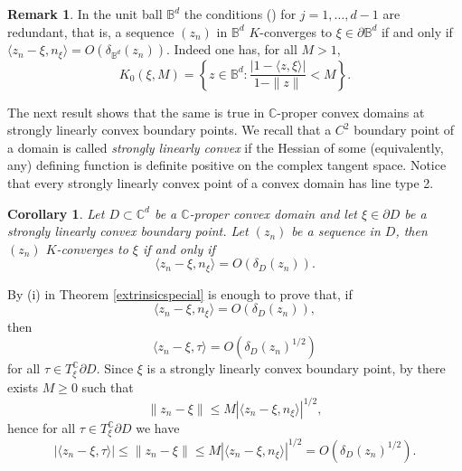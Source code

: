 \documentclass[11pt, reqno]{amsart}
\numberwithin{equation}{section}
\newtheorem{corollary}[theorem]{Corollary}
\theoremstyle{definition}
\newtheorem{remark}[theorem]{Remark}
\newcommand{\C}{\mathbb{C}}
\newcommand{\B}{\mathbb{B}}
\begin{document}
{{		
			\begin{remark}\label{restrictedball}In the unit ball $\B^d$ the conditions () for $j=1,\dots,d-1$ are redundant, that is, 
			a sequence $(z_n)$ in $\B^d$ $K$-converges to $\xi\in \partial \B^d$ if and only if 
		$\langle z_n-\xi,n_\xi\rangle=O\left(\delta_{\B^d}(z_n)\right).$ Indeed one has, for all $M>1$,
			\begin{equation}\label{koranyiball}
				K_0(\xi,M)=\left\{z\in \B^d:\frac{|1-\langle z,\xi\rangle|}{1-\|z\|}<M\right\}.
			\end{equation}
			\end{remark}
			The next result shows that the same is true  in $\C$-proper convex domains at strongly linearly convex boundary points. We recall that a $C^2$  boundary point of a domain is called \textit{strongly linearly convex} if the Hessian of some (equivalently, any) defining function is definite positive on the complex tangent space.
			Notice that every  strongly linearly convex point of a convex domain has line type 2.
\begin{corollary}
		Let $D\subset\C^d$ be a $\C$-proper convex domain and let $\xi\in\partial D$ be a strongly linearly convex boundary point. Let $(z_n)$ be a sequence in $D$, then
		$(z_n)$ $K$-converges to $\xi$ if and only if 
		$$\langle z_n-\xi,n_\xi\rangle=O\left(\delta_D(z_n)\right).$$
\end{corollary}
\proof
By (i) in Theorem \ref{extrinsicspecial} is enough to prove that, if $$\langle z_n-\xi,n_\xi\rangle=O\left(\delta_D(z_n)\right),$$ then
$$\langle z_n-\xi,\tau\rangle=O\left(\delta_D(z_n)^{1/2}\right)$$
for all $\tau\in T_\xi^\C\partial D$.
Since $\xi$ is a strongly linearly convex boundary point, by \cite[Proposition 22]{KNO} there exists $M\geq 0$ such that 
$$\|z_n-\xi\|\leq M |\langle z_n-\xi,n_\xi\rangle|^{1/2},$$
hence for all $\tau\in T_\xi^\C\partial D$ we have
$$|\langle z_n-\xi,\tau\rangle|\leq \|z_n-\xi\|\leq M|\langle z_n-\xi,n_\xi\rangle|^{1/2}=O\left(\delta_D(z_n)^{1/2}\right).$$
\endproof

}}
\end{document}
